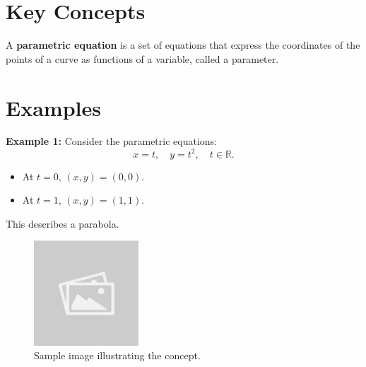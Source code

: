 \documentclass{article}
\begin{document}
\section*{Key Concepts}
\begin{definitionbox}
A \textbf{parametric equation} is a set of equations that express the coordinates of the points of a curve as functions of a variable, called a parameter.
\end{definitionbox}

\section*{Examples}
\begin{examplebox}
\textbf{Example 1:} Consider the parametric equations:
\[ x = t, \quad y = t^2, \quad t \in \mathbb{R}. \]
\begin{itemize}
    \item At $t = 0$, $(x, y) = (0, 0)$.
    \item At $t = 1$, $(x, y) = (1, 1)$.
\end{itemize}
This describes a parabola.

\begin{figure}[H]
    \centering
    \includegraphics[width=0.35\textwidth]{sample_image.jpg}
    \caption{Sample image illustrating the concept.}
    \label{fig:sample_image}
\end{figure}

\end{examplebox}
\end{document}
